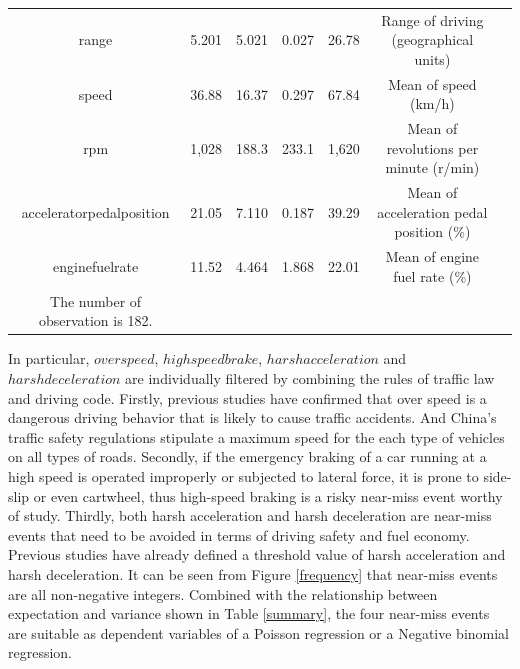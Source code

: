 \documentclass[num-refs]{wiley-article}
\begin{document}
\begin{table}[htbp]
{\begin{threeparttable}
\begin{tabular}{ccccccc}
range                    & 5.201 & 5.021              & 0.027  & 26.78   & Range of driving (geographical units)                                        &  \\
speed                    & 36.88 & 16.37              & 0.297   & 67.84   & Mean of speed (km/h)                                                         &  \\
rpm                      & 1,028 & 188.3              & 233.1   & 1,620   & Mean of revolutions per minute (r/min)                                       &  \\
acceleratorpedalposition & 21.05 & 7.110              & 0.187   & 39.29   & Mean of acceleration pedal position (\%)                                     &  \\
enginefuelrate           & 11.52 & 4.464              & 1.868   & 22.01   & Mean of engine fuel rate (\%)   & \\
\hline
\footnotesize{The number of observation is 182.}
\end{tabular}
\end{threeparttable}}
\end{table}

In particular, $overspeed$, $highspeedbrake$, $harshacceleration$ and $harshdeceleration$ are individually filtered by combining the rules of traffic law and driving code. Firstly, previous studies have confirmed that over speed is a dangerous driving behavior that is likely to cause traffic accidents\cite{litman2007distance}. And China's traffic safety regulations stipulate a maximum speed for the each type of vehicles on all types of roads. Secondly, if the emergency braking of a car running at a high speed is operated improperly or subjected to lateral force, it is prone to side-slip or even cartwheel, thus high-speed braking is a risky near-miss event worthy of study. Thirdly, both harsh acceleration and harsh deceleration are near-miss events that need to be avoided in terms of driving safety and fuel economy. Previous studies have already defined a threshold value of harsh acceleration and harsh deceleration\cite{gao2019evaluation,guillen2020can}. It can be seen from Figure \ref{frequency} that near-miss events are all non-negative integers. Combined with the relationship between expectation and variance shown in Table \ref{summary}, the four near-miss events are suitable as dependent variables of a Poisson regression or a Negative binomial regression.
\end{document}
